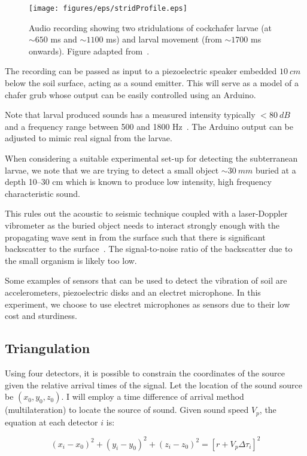 \documentclass[twocolumn]{article}
\begin{document}
\begin{figure}
    \centering
    \texttt{[image: figures/eps/stridProfile.eps]}
    \caption{Audio recording showing two stridulations of cockchafer larvae (at $\sim650$ ms and $\sim1100$ ms) and larval movement (from $\sim1700$ ms onwards). Figure adapted from~\cite{stridDetect}.}
    \label{fig:stridProfile}
\end{figure}

The recording can be passed as input to a piezoelectric speaker embedded $10\ \si{cm}$ below the soil surface, acting as a sound emitter. This will serve as a model of a chafer grub whose output can be easily controlled using an Arduino.

Note that larval produced sounds has a measured intensity typically $< 80\ \si{dB}$ and a frequency range between 500 and 1800 Hz~\cite{xrayTom}. The Arduino output can be adjusted to mimic real signal from the larvae.

When considering a suitable experimental set-up for detecting the subterranean larvae, we note that we are trying to detect a small object $\sim30\ \si{mm}$ buried at a depth 10--30 cm which is known to produce low intensity, high frequency characteristic sound.

This rules out the acoustic to seismic technique coupled with a laser-Doppler vibrometer as the buried object needs to interact strongly enough with the propagating wave sent in from the surface such that there is significant backscatter to the surface~\cite{acousSeisCouple}. The signal-to-noise ratio of the backscatter due to the small organism is likely too low.

Some examples of sensors that can be used to detect the vibration of soil are accelerometers, piezoelectric disks and an electret microphone. In this experiment, we choose to use electret microphones as sensors due to their low cost and sturdiness.

\subsection{Triangulation}
Using four detectors, it is possible to constrain the coordinates of the source given the relative arrival times of the signal. Let the location of the sound source be $(x_0,y_0,z_0)$. I will employ a time difference of arrival method (multilateration) to locate the source of sound. Given sound speed $V_p$, the equation at each detector $i$ is:

\begin{equation}
    \label{eq:triangulation}
    (x_i-x_0)^2 + (y_i - y_0)^2 + (z_i - z_0)^2 = [r+V_p\Delta\tau_i]^2
\end{equation}
\end{document}
